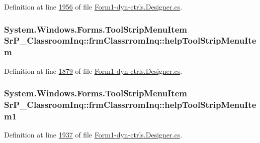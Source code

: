 \-Definition at line \hyperlink{_form1-dyn-ctrls_8_designer_8cs_source_l01956}{1956} of file \hyperlink{_form1-dyn-ctrls_8_designer_8cs_source}{\-Form1-\/dyn-\/ctrls.\-Designer.\-cs}.

\hypertarget{class_sr_p___classroom_inq_1_1frm_classrrom_inq_a2cf34a0cb0b52c60e6faea821b2ce0a9}{
\subsubsection[{help\-Tool\-Strip\-Menu\-Item}]{\setlength{\rightskip}{0pt plus 5cm}\-System.\-Windows.\-Forms.\-Tool\-Strip\-Menu\-Item {\bf \-Sr\-P\-\_\-\-Classroom\-Inq\-::frm\-Classrrom\-Inq\-::help\-Tool\-Strip\-Menu\-Item}}}
\label{class_sr_p___classroom_inq_1_1frm_classrrom_inq_a2cf34a0cb0b52c60e6faea821b2ce0a9}


\-Definition at line \hyperlink{_form1-dyn-ctrls_8_designer_8cs_source_l01879}{1879} of file \hyperlink{_form1-dyn-ctrls_8_designer_8cs_source}{\-Form1-\/dyn-\/ctrls.\-Designer.\-cs}.

\hypertarget{class_sr_p___classroom_inq_1_1frm_classrrom_inq_a09bf82e0de8e7288e39988c7bfc5f5e7}{
\subsubsection[{help\-Tool\-Strip\-Menu\-Item1}]{\setlength{\rightskip}{0pt plus 5cm}\-System.\-Windows.\-Forms.\-Tool\-Strip\-Menu\-Item {\bf \-Sr\-P\-\_\-\-Classroom\-Inq\-::frm\-Classrrom\-Inq\-::help\-Tool\-Strip\-Menu\-Item1}}}
\label{class_sr_p___classroom_inq_1_1frm_classrrom_inq_a09bf82e0de8e7288e39988c7bfc5f5e7}


\-Definition at line \hyperlink{_form1-dyn-ctrls_8_designer_8cs_source_l01937}{1937} of file \hyperlink{_form1-dyn-ctrls_8_designer_8cs_source}{\-Form1-\/dyn-\/ctrls.\-Designer.\-cs}.

